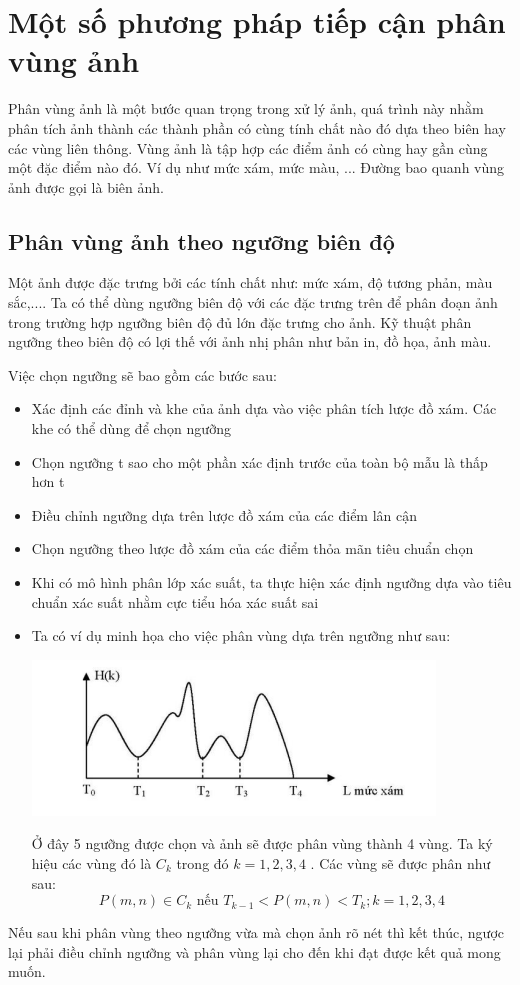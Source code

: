 \documentclass[12pt, oneside, a4]{book}
\begin{document}
\chapter{Một số phương pháp tiếp cận phân vùng ảnh}
Phân vùng ảnh là một bước quan trọng trong xử lý ảnh, quá trình này nhằm phân tích ảnh thành các thành phần có cùng tính chất nào đó dựa theo biên hay các vùng liên thông. Vùng ảnh là tập hợp các điểm ảnh có cùng hay gần cùng một đặc điểm nào đó. Ví dụ như mức xám, mức màu, ...  Đường bao quanh vùng ảnh được gọi là biên ảnh.
\section{Phân vùng ảnh theo ngưỡng biên độ}
Một ảnh được đặc trưng bởi các tính chất như: mức xám, độ tương phản, màu sắc,.... Ta có thể dùng ngưỡng biên độ với các đặc trưng trên để phân đoạn ảnh trong trường hợp ngưỡng biên độ đủ lớn đặc trưng cho ảnh. Kỹ thuật phân ngưỡng theo biên độ có lợi thế với ảnh nhị phân như bản in, đồ họa, ảnh màu.

Việc chọn ngưỡng sẽ bao gồm các bước sau:
\begin{itemize}
\item Xác định các đỉnh và khe của ảnh dựa vào việc phân tích lược đồ xám. Các khe có thể dùng để chọn ngưỡng
\item Chọn ngưỡng t sao cho một phần xác định trước của toàn bộ mẫu là thấp hơn t
\item Điều chỉnh ngưỡng dựa trên lược đồ xám của các điểm lân cận
\item Chọn ngưỡng theo lược đồ xám của các điểm thỏa mãn tiêu chuẩn chọn
\item Khi có mô hình phân lớp xác suất, ta thực hiện xác định ngưỡng dựa vào tiêu chuẩn xác suất nhằm cực tiểu hóa xác suất sai
\item Ta có ví dụ minh họa cho việc phân vùng dựa trên ngưỡng như sau:
\begin{center}
\includegraphics[]{figure/nguongbiendo.png}
\end{center}
Ở đây 5 ngưỡng được chọn và ảnh sẽ được phân vùng thành 4 vùng. Ta ký hiệu các vùng đó là $C_k$ trong đó $k=1,2,3,4$   . Các vùng sẽ được phân như sau:
\begin{equation}
P(m,n) \in C_{k}\textrm{ nếu } T_{k-1}<P(m,n)<T_{k}; k=1,2,3,4
\end{equation} 
\end{itemize}
Nếu sau khi phân vùng theo ngưỡng vừa mà chọn ảnh rõ nét thì kết thúc, ngược lại phải điều chỉnh ngưỡng và phân vùng lại cho đến khi đạt được kết quả mong muốn.
\end{document}
